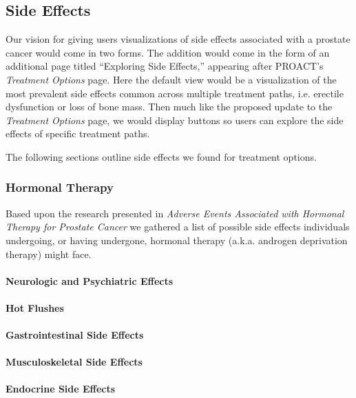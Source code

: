 \documentclass[journal]{vgtc}                %
\begin{document}
        \subsection{Side Effects}
                Our vision for giving users visualizations of side effects associated with a prostate cancer would come in two forms.
                The addition would come in the form of an additional page titled ``Exploring Side Effects,'' appearing after PROACT's \textit{Treatment Options} page.
                Here the default view would be a visualization of the most prevalent side effects common across multiple treatment paths, i.e. erectile dysfunction or loss of bone mass.
                Then much like the proposed update to the \textit{Treatment Options} page, we would display buttons so users can explore the side effects of specific treatment paths.

                The following sections outline side effects we found for treatment options.

                \subsubsection{Hormonal Therapy}
                        Based upon the research presented in \textit{Adverse Events Associated with Hormonal Therapy for Prostate Cancer}\cite{AdverseEvents:2005} we gathered a list of possible side effects individuals undergoing, or having undergone, hormonal therapy (a.k.a. androgen deprivation therapy) might face.

                        \paragraph{Neurologic and Psychiatric Effects}
                        \paragraph{Hot Flushes}
                        \paragraph{Gastrointestinal Side Effects}
                        \paragraph{Musculoskeletal Side Effects}
                        \paragraph{Endocrine Side Effects}
\end{document}
